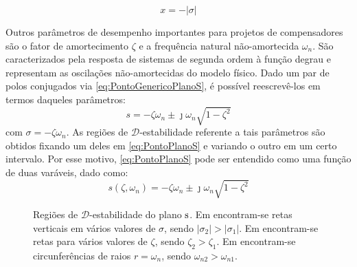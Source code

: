 \begin{equation}
  x = -|\sigma|\label{eq:Sigma}
\end{equation}

Outros parâmetros de desempenho importantes para projetos de compensadores são o fator de amortecimento $\zeta$ e a frequência natural não-amortecida $\omega_n$. São caracterizados pela resposta de sistemas de segunda ordem à função degrau \cite{NISE2011}\cite{OGATA2011} e representam as oscilações não-amortecidas do modelo físico. Dado um par de polos conjugados via \eqref{eq:PontoGenericoPlanoS}, é possível reescrevê-los em termos daqueles parâmetros:
\begin{equation}
  s = -\zeta\omega_n \pm \jmath\omega_n \sqrt {1-\zeta^2} \label{eq:PontoPlanoS}
\end{equation}
com $\sigma = -\zeta\omega_n$. As regiões de $\mathscr{D}$-estabilidade referente a tais parâmetros são obtidos fixando um deles em \eqref{eq:PontoPlanoS} e variando o outro em um certo intervalo. Por esse motivo, \eqref{eq:PontoPlanoS} pode ser entendido como uma função de duas varáveis, dado como:
\begin{equation}
  s(\zeta,\omega_n) = -\zeta\omega_n \pm \jmath\omega_n \sqrt {1-\zeta^2} \label{eq:FuncaoPontoPlanoS}
\end{equation}

\begin{figure}[!ht]
  \centering
  \begin{subfigure}[t]{0.3\columnwidth}
      
      \caption{}
      \label{subfig:EstabilidadeRelativaS}
  \end{subfigure}
  \begin{subfigure}[t]{0.3\columnwidth}
      
      \caption{}
      \label{subfig:TaxaDeAmortecimentoS}
  \end{subfigure}
  \begin{subfigure}[t]{0.35\columnwidth}
    
    \caption{}
    \label{subfig:OscilacaoNaoAmortecidaS}
  \end{subfigure}
  \caption{Regiões de $\mathscr{D}$-estabilidade do plano $\operatorname{\mathrm{s}}$. Em  encontram-se retas verticais em vários valores de $\sigma$, sendo $|\sigma_2| > |\sigma_1|$. Em  encontram-se retas para vários valores de $\zeta$, sendo $\zeta_2 > \zeta_1$. Em  encontram-se circunferências de raios $r = \omega_n$, sendo $\omega_{n2} > \omega_{n1}$.}
  \label{fig:RegioesPlanoS}
\end{figure}

